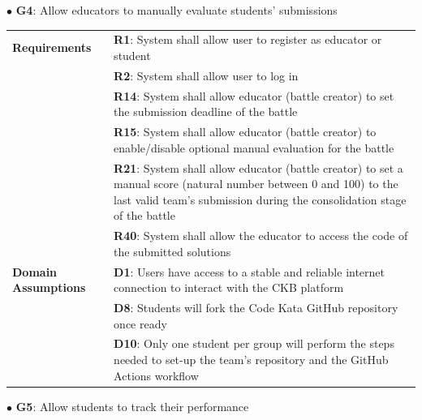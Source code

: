 $\bullet$ \textbf{G4}: Allow educators to manually evaluate students' submissions
\begin{center}
    \begin{tabular}{ |m{3cm}|m{10cm}| }
        \hline
        \textbf{Requirements} 
        & \textbf{R1}: System shall allow user to register as educator or student \\
        & \textbf{R2}: System shall allow user to log in \\
        & \textbf{R14}: System shall allow educator (battle creator) to set the submission deadline of the battle \\
        & \textbf{R15}: System shall allow educator (battle creator) to enable/disable optional manual evaluation for the battle \\
        & \textbf{R21}: System shall allow educator (battle creator) to set a manual score (natural number between 0 and 100) to the last valid team’s submission during the consolidation stage of the battle \\
        & \textbf{R40}: System shall allow the educator to access the code of the submitted solutions \\
        \hline
        \textbf{Domain \newline Assumptions} 
        & \textbf{D1}: Users have access to a stable and reliable internet connection to interact with the CKB platform \\
        & \textbf{D8}: Students will fork the Code Kata GitHub repository once ready \\
        & \textbf{D10}: Only one student per group will perform the steps needed to set-up the team's repository and the GitHub Actions workflow \\
        \hline
    \end{tabular}
\end{center} 
\newpage
$\bullet$ \textbf{G5}: Allow students to track their performance
